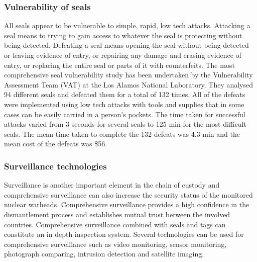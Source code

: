 \documentclass[twoside,titlepage,11pt,twocolumn,a4paper]{article}
\begin{document}
\subsubsection{Vulnerability of seals}
All seals appear to be vulnerable to simple, rapid, low tech
attacks. Attacking a seal means to trying to gain access to whatever
the seal is protecting without being detected. Defeating a seal means
opening the seal without being detected or leaving evidence of entry,
or repairing any damage and erasing evidence of entry, or replacing
the entire seal or parts of it with counterfeits. The most
comprehensive seal vulnerability study has been undertaken by the
Vulnerability Assessment Team (VAT) at the Los Alamos National
Laboratory. They analysed 94 different seals and defeated them for a
total of 132 times. All of the defeats were implemented using low tech
attacks with tools and supplies that in some cases can be easily
carried in a person's pockets. The time taken for successful attacks
varied from 3 seconds for several seals to 125 min for the most
difficult seals. The mean time taken to complete the 132 defeats was
4.3 min and the mean cost of the defeats was
\$56. \citep{vulnSecSeals1997}

\subsubsection{Surveillance technologies}
Surveillance is another important element in the chain of custody and
comprehensive surveillance can also increase the security status of
the monitored nuclear warheads. Comprehensive surveillance provides a
high confidence in the dismantlement process and establishes mutual
trust between the involved countries. Comprehensive surveillance
combined with seals and tags can constitute an in depth inspection
system. Several technologies can be used for comprehensive
surveillance such as video monitoring, sensor monitoring, photograph
comparing, intrusion detection and satellite
imaging. \citep{wuwen2004}
\end{document}
